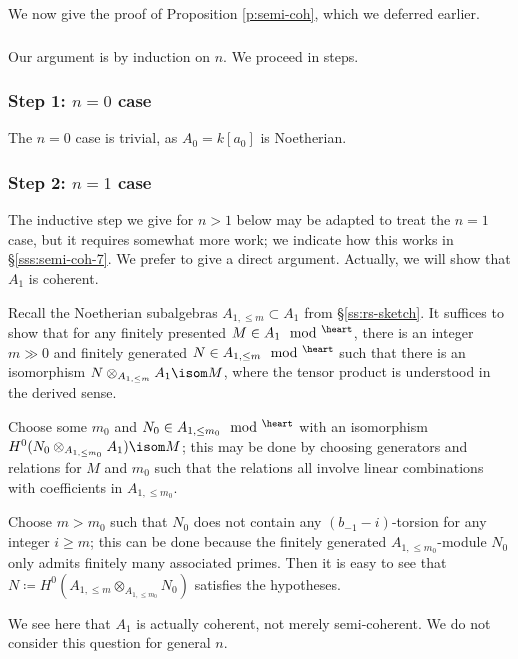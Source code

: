 We now give the proof of Proposition \ref{p:semi-coh}, which we deferred earlier.

\subsubsection{}

Our argument is by induction on $n$. We proceed in steps.

\subsubsection{Step 1: $n = 0$ case}

The $n = 0$ case is trivial, as $A_0 = k[a_0]$ is Noetherian.

\subsubsection{Step 2: $n = 1$ case}

The inductive step we give for $n>1$ below may be adapted to treat the
$n = 1$ case, but it requires somewhat more work; we indicate how this works
in \S \ref{sss:semi-coh-7}. We prefer
to give a direct argument. Actually, we will show that $A_1$ is coherent.

Recall the Noetherian subalgebras $A_{1,\leq m} \subset A_1$ from \S \ref{ss:rs-sketch}.
It suffices to show that for any finitely presented $M \in A_1\mod^{\heart}$,
there is an integer $m \gg 0$ and finitely generated
$N \in A_{1,\leq m}\mod^{\heart}$ such that
there is an isomorphism $N \otimes_{A_{1,\leq m}} A_1 \isom M$, where
the tensor product is understood in the derived sense.

Choose some $m_0$ and $N_0 \in A_{1,\leq m_0}\mod^{\heart}$ with an
isomorphism $H^0(N_0 \otimes_{A_{1,\leq m_0}} A_1) \isom M$; this may be
done by choosing generators and relations for $M$ and $m_0$ such that
the relations all involve linear combinations with coefficients in $A_{1,\leq m_0}$.

Choose $m > m_0$ such that $N_0$ does not contain any $(b_{-1}-i)$-torsion
for any integer $i\geq m$; this can be done because the finitely generated
$A_{1,\leq m_0}$-module $N_0$ only admits finitely many associated primes.
Then it is easy to see that $N \coloneqq
H^0(A_{1,\leq m} \otimes_{A_{1,\leq m_0}} N_0)$ satisfies the hypotheses.

\begin{rem}
\notready

We see here that $A_1$ is actually coherent, not merely semi-coherent.
We do not consider this question for general $n$.

\end{rem}

